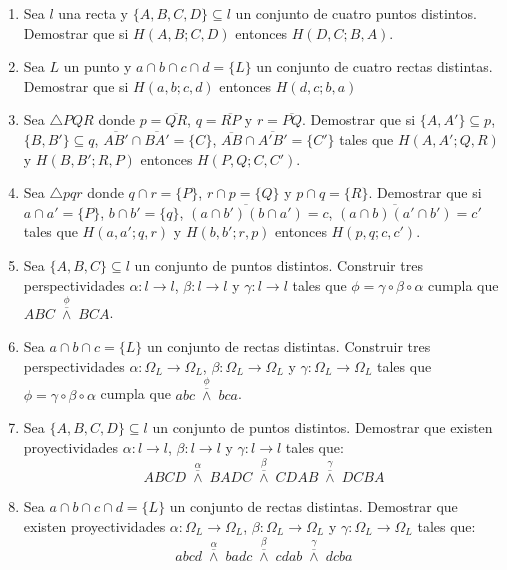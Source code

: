 \documentclass[12pt]{report}
\numberwithin{section}{chapter}
\begin{document}
\begin{enumerate}
\item Sea $l$ una recta y $\{A,B,C,D\} \subseteq l$ un conjunto de cuatro puntos distintos. Demostrar que si $H(A,B;C,D)$ entonces $H(D,C; B,A)$.

\item Sea $L$ un punto y $a\cap b\cap c\cap d =\{L\}$ un conjunto de cuatro rectas distintas. Demostrar que si $H(a,b;c,d)$ entonces $H(d,c; b,a)$

\item Sea $\triangle PQR$ donde $p = \overline{QR}$, $q=\overline{RP}$ y $r=\overline{PQ}$. Demostrar que si $\{A,A'\}\subseteq p$, $\{B, B'\}\subseteq q$, $\overline{AB'}\cap\overline{BA'}=\{C\}$, $\overline{AB}\cap\overline{A'B'}=\{C'\}$ tales que $H(A,A';Q,R)$ y $H(B,B';R,P)$ entonces $H(P,Q;C,C')$.

\item Sea $\triangle pqr$ donde $q \cap r= \{P\}$, $r \cap p =\{Q\}$ y $p \cap q =\{R\}$. Demostrar que si $a \cap a' = \{P\}$, $b \cap b' = \{q\}$, $\overline{(a \cap b')(b \cap a')}=c$, $\overline{(a \cap b)(a' \cap b')}=c'$ tales que $H(a,a';q,r)$ y $H(b,b';r,p)$ entonces $H(p,q;c,c')$.

\item Sea $\{A,B,C\}\subseteq l$ un conjunto de puntos distintos. Construir tres perspectividades $\alpha: l \to l$, $\beta:l \to l$ y $\gamma: l \to l$ tales que $\phi=\gamma \circ \beta \circ \alpha$ cumpla que $ABC\;\overset{\phi}{\overline{\wedge}}\; BCA$.

\item Sea $a \cap b \cap c = \{L\}$ un conjunto de rectas distintas. Construir tres perspectividades $\alpha: \Omega_L \to \Omega_L$, $\beta:\Omega_L \to \Omega_L$ y $\gamma: \Omega_L \to \Omega_L$ tales que $\phi=\gamma \circ \beta \circ \alpha$ cumpla que $abc\;\overset{\phi}{\overline{\wedge}}\; bca$.

\item Sea $\{A,B,C,D\}\subseteq l$ un conjunto de puntos distintos. Demostrar que existen proyectividades $\alpha: l \to l$, $\beta: l \to l$ y $\gamma:l \to l$ tales que:
$$ABCD\; \overset{\alpha}{\overline{\wedge}}\; BADC\; \overset{\beta}{\overline{\wedge}}\; CDAB \; \overset{\gamma}{\overline{\wedge}}\;DCBA$$

\item Sea $a \cap b \cap c \cap d =\{L\}$ un conjunto de rectas distintas. Demostrar que existen proyectividades $\alpha: \Omega_L \to \Omega_L$, $\beta: \Omega_L \to \Omega_L$ y $\gamma:\Omega_L \to \Omega_L$ tales que:
$$abcd\; \overset{\alpha}{\overline{\wedge}}\; badc\; \overset{\beta}{\overline{\wedge}}\; cdab \; \overset{\gamma}{\overline{\wedge}}\;dcba$$


\end{enumerate}
\end{document}
